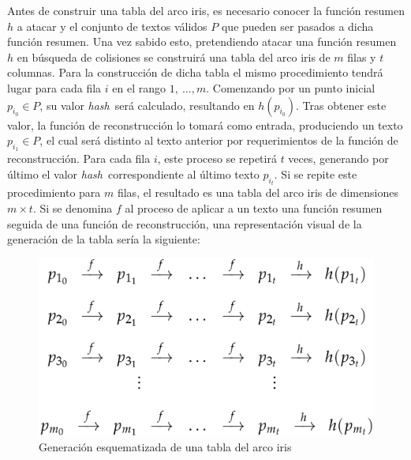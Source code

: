 \documentclass[12pt,spanish,listoffigures,listoftables,listofalgorithms]{tfgetsinf}
\newcommand{\hash}{\textit{hash}}
\begin{document}
Antes de construir una tabla del arco iris, es necesario conocer la función resumen $h$ a atacar y el conjunto de textos válidos $P$ que pueden ser pasados a dicha función resumen. Una vez sabido esto, pretendiendo atacar una función resumen $h$ en búsqueda de colisiones se construirá una tabla del arco iris de $m$ filas y $t$ columnas. Para la construcción de dicha tabla el mismo procedimiento tendrá lugar para cada fila $i$ en el rango $1,~\dots, m$. Comenzando por un punto inicial $p_{i_0} \in P$, su valor \hash~será calculado, resultando en $h(p_{i_0})$. Tras obtener este valor, la función de reconstrucción lo tomará como entrada, produciendo un texto $p_{i_1} \in P$, el cual será distinto al texto anterior por requerimientos de la función de reconstrucción. Para cada fila $i$, este proceso se repetirá $t$ veces, generando por último el valor \hash~correspondiente al último texto $p_{i_t}$. Si se repite este procedimiento para $m$ filas, el resultado es una tabla del arco iris de dimensiones $m \times t$. Si se denomina $f$ al proceso de aplicar a un texto una función resumen seguida de una función de reconstrucción, una representación visual de la generación de la tabla sería la siguiente:


\begin{figure}[H]
	\centering
	\includegraphics[scale = 0.20]{tabla_rainbow}
	\caption{Generación esquematizada de una tabla del arco iris}
	\label{tabla_rainbow_gen}
\end{figure}
\end{document}
